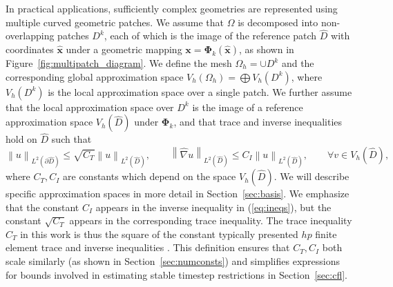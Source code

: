 \documentclass[preprint,10pt]{elsarticle}
\newcommand{\nor}[1]{\left\| #1 \right\|}
\newcommand{\LRp}[1]{\left( #1 \right)}
\newcommand{\LRc}[1]{\left\{ #1 \right\}}
\newcommand{\Grad} {\ensuremath{\nabla}}
\newcommand{\Dhat}{\widehat{D}}
\begin{document}

In practical applications, sufficiently complex geometries are represented using multiple curved geometric patches.  We assume that $\Omega$ is decomposed into non-overlapping patches $D^k$, each of which is the image of the reference patch $\Dhat$ with coordinates $\widehat{\bm{x}}$ under a geometric mapping $\bm{x} = \bm{\Phi}_k(\bm{\widehat{x}})$, as shown in Figure~\ref{fig:multipatch_diagram}.   We define the mesh $\Omega_h = \cup D^k$ and the corresponding global approximation space $V_h(\Omega_h) = \bigoplus V_h\LRp{D^k}$, where $V_h\LRp{D^k}$ is the local approximation space over a single patch.  We further assume that the local approximation space over $D^k$ is the image of a reference approximation space $V_h\LRp{\widehat{D}}$ under $\bm{\Phi}_k$, and  that trace and inverse inequalities hold on $\Dhat$ such that 
\begin{equation}
\nor{u}_{L^2\LRp{\partial \Dhat}} \leq \sqrt{C_T} \nor{u}_{L^2\LRp{\Dhat}}, \qquad \nor{\widehat{\Grad} u}_{L^2\LRp{\Dhat}} \leq C_I \nor{u}_{L^2\LRp{\Dhat}}, \qquad \forall v\in V_h\LRp{\Dhat},
\label{eq:ineqs}
\end{equation}
where $C_T, C_I$ are constants which depend on the space $V_h\LRp{\Dhat}$.  We will describe specific approximation spaces in more detail in Section~\ref{sec:basis}.  %
{\color{forestgreen} We emphasize that the constant $C_I$ appears in the inverse inequality in (\ref{eq:ineqs}), but the constant $\sqrt{C_T}$ appears in the corresponding trace inequality.  The trace inequality $C_T$ in this work is thus the square of the constant typically presented $hp$ finite element trace and inverse inequalities \cite{ciarlet1978finite, warburton2003constants}.  This definition ensures that $C_T, C_I$ both scale similarly (as shown in Section~\ref{sec:numconsts}) and simplifies expressions for bounds involved in estimating stable timestep restrictions in Section~\ref{sec:cfl}.  }
\end{document}
